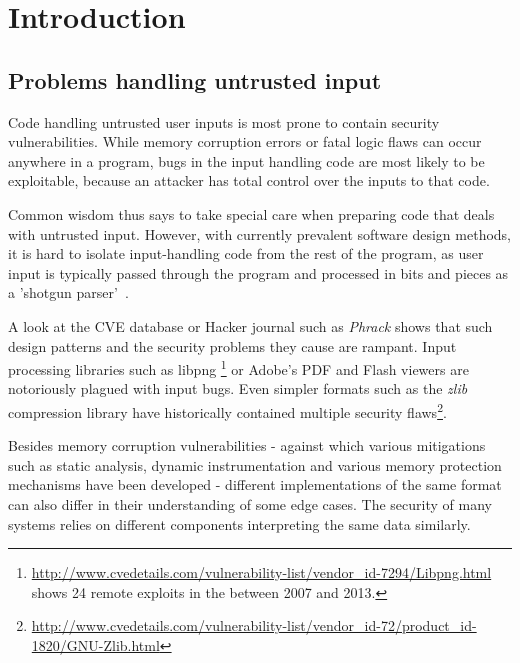 \section{Introduction}




\subsection{Problems handling untrusted input}
Code handling untrusted user inputs is most prone to contain security vulnerabilities. While memory
corruption errors or fatal logic flaws can occur anywhere in a program, bugs in the input handling
code are most likely to be exploitable, because an attacker has total control over the inputs to
that code. 

Common wisdom thus says to take special care when preparing code that deals with untrusted input.
However, with currently prevalent software design methods, it is hard to isolate input-handling code
from the rest of the program, as user input is typically passed through the program and processed in
bits and pieces as a 'shotgun parser'~\cite{shotgun-parser}.  

A look at the CVE database or Hacker journal such as \textit{Phrack} shows that such design patterns
and the security problems they cause are rampant. Input processing libraries such as libpng
\footnote{\url{http://www.cvedetails.com/vulnerability-list/vendor_id-7294/Libpng.html} shows 24
remote exploits in the between 2007 and 2013.} or Adobe's PDF and Flash viewers are notoriously
plagued with input bugs. Even simpler formats such as the \textit{zlib} compression library have
historically contained multiple security
flaws\footnote{\url{http://www.cvedetails.com/vulnerability-list/vendor_id-72/product_id-1820/GNU-Zlib.html}}.

Besides memory corruption vulnerabilities - against which various mitigations such as static
analysis, dynamic instrumentation and various memory protection mechanisms have been developed -
different implementations of the same format can also differ in their understanding of some edge
cases. The security of many systems relies on different components interpreting the same data
similarly.

